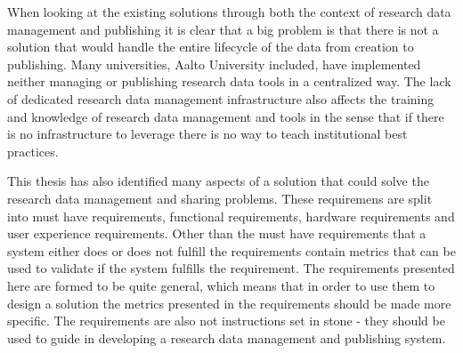 When looking at the existing solutions through both the context of research
data management and publishing it is clear that a big problem is that there
is not a solution that would handle the entire lifecycle of the data from
creation to publishing. Many universities, Aalto University included, have
implemented neither managing or publishing research data tools in a centralized
way. The lack of dedicated research data management
infrastructure also affects the training and knowledge of research data
management and tools in the sense that if there is no infrastructure to
leverage there is no way to teach institutional best practices.

\clearpage

This thesis has also identified many aspects of a solution that could solve the
research data management and sharing problems. These requiremens are split into
must have requirements, functional requirements, hardware requirements and
user experience requirements. Other than the must have requirements that a
system either does or does not fulfill the requirements contain metrics that
can be used to validate if the system fulfills the requirement. The
requirements presented here are formed to be quite general,
which means that in order to use them to design a solution the metrics
presented in the requirements should be made more specific. The requirements
are also not instructions set in stone - they should be used to guide in
developing a research data management and publishing system.


